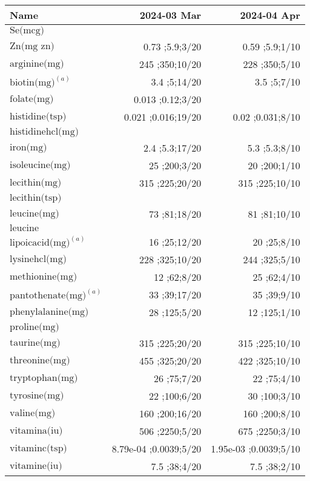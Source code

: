 \begin{table}[H]
\centering
\begin{tabular}{|l|r|r|}
\hline
Name&2024-03 Mar&2024-04 Apr\\
\hline
$\textrm{Se(mcg)}$&&\\
$\textrm{Zn(mg~zn)}$&0.73 ;5.9;3/20&0.59 ;5.9;1/10\\
$\textrm{arginine(mg)}$&245 ;350;10/20&228 ;350;5/10\\
$\textrm{biotin(mg)}^{\left(a\right)}$&3.4 ;5;14/20&3.5 ;5;7/10\\
$\textrm{folate(mg)}$&0.013 ;0.12;3/20&\\
$\textrm{histidine(tsp)}$&0.021 ;0.016;19/20&0.02 ;0.031;8/10\\
$\textrm{histidinehcl(mg)}$&&\\
$\textrm{iron(mg)}$&2.4 ;5.3;17/20&5.3 ;5.3;8/10\\
$\textrm{isoleucine(mg)}$&25 ;200;3/20&20 ;200;1/10\\
$\textrm{lecithin(mg)}$&315 ;225;20/20&315 ;225;10/10\\
$\textrm{lecithin(tsp)}$&&\\
$\textrm{leucine(mg)}$&73 ;81;18/20&81 ;81;10/10\\
$\textrm{leucine}$&&\\
$\textrm{lipoicacid(mg)}^{\left(a\right)}$&16 ;25;12/20&20 ;25;8/10\\
$\textrm{lysinehcl(mg)}$&228 ;325;10/20&244 ;325;5/10\\
$\textrm{methionine(mg)}$&12 ;62;8/20&25 ;62;4/10\\
$\textrm{pantothenate(mg)}^{\left(a\right)}$&33 ;39;17/20&35 ;39;9/10\\
$\textrm{phenylalanine(mg)}$&28 ;125;5/20&12 ;125;1/10\\
$\textrm{proline(mg)}$&&\\
$\textrm{taurine(mg)}$&315 ;225;20/20&315 ;225;10/10\\
$\textrm{threonine(mg)}$&455 ;325;20/20&422 ;325;10/10\\
$\textrm{tryptophan(mg)}$&26 ;75;7/20&22 ;75;4/10\\
$\textrm{tyrosine(mg)}$&22 ;100;6/20&30 ;100;3/10\\
$\textrm{valine(mg)}$&160 ;200;16/20&160 ;200;8/10\\
$\textrm{vitamina(iu)}$&506 ;2250;5/20&675 ;2250;3/10\\
$\textrm{vitaminc(tsp)}$&8.79e-04 ;0.0039;5/20&1.95e-03 ;0.0039;5/10\\
$\textrm{vitamine(iu)}$&7.5 ;38;4/20&7.5 ;38;2/10\\

\end{tabular}
\end{table}
